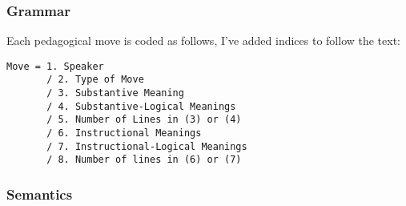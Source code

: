 \documentclass[10pt, letterpaper]{article}
\begin{document}
\subsubsection*{Grammar}
\label{sec:org8901c17}
Each pedagogical move is coded as follows, I've added indices to follow the text: \\
\begin{verbatim}
Move = 1. Speaker 
       / 2. Type of Move 
       / 3. Substantive Meaning
       / 4. Substantive-Logical Meanings 
       / 5. Number of Lines in (3) or (4) 
       / 6. Instructional Meanings 
       / 7. Instructional-Logical Meanings 
       / 8. Number of lines in (6) or (7) 
\end{verbatim}

\subsubsection*{Semantics}
\label{sec:org10a0172}
\end{document}
